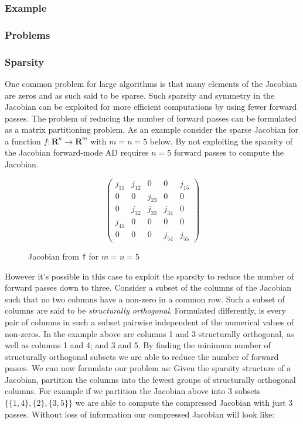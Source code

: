 \subsubsection{Example}
\subsubsection{Problems}
\subsubsection{Sparsity}
One common problem for large algorithms is that many elements of the Jacobian
are zeros and as such said to be sparse. Such sparsity and symmetry in the Jacobian can 
be exploited for more efficient computations by using fewer forward passes. The problem
of reducing the number of forward passes can be formulated as a matrix partitioning problem. 
As an example consider the sparse Jacobian for a function $f: \mathbf{R}^n \to  \mathbf{R}^m$ with $m=n=5$ below. By not exploiting the sparsity of the Jacobian forward-mode AD requires $n=5$ forward passes to compute the Jacobian.
\begin{figure}[H]
	$$ \left(\begin{matrix}
    j_{11} & j_{12} & 0 & 0 & j_{15} \\
    0 & 0 & j_{23} & 0 & 0 \\
    0 & j_{32} & j_{33} & j_{34} & 0 \\
    j_{41} & 0 & 0 & 0 & 0 \\
    0 & 0 & 0 & j_{54} & j_{55} 
	\end{matrix}\right) $$
	\caption{Jacobian from \texttt{f} for $m=n=5$}
\end{figure}
However it's possible in this case to exploit the sparsity to reduce the number of forward passes down to three. Consider a subset of the columns of the Jacobian such that no two columns have a non-zero in a common row. Such a subset of columns are said to be \emph{structurally orthogonal}. Formulated differently, is every pair of columns in such a subset pairwise independent of the numerical values of non-zeros. In the example above are columns 1 and 3 structurally orthogonal, as well as columns 1 and 4; and 3 and 5. By finding the minimum number of structurally orthogonal subsets we are able to reduce the number of forward passes. 
We can now formulate our problem as:
Given the sparsity structure of a Jacobian, partition the columns into the fewest groups of structurally orthogonal columns. For example if we partition the Jacobian above into 3 subsets $\{\{1,4\}, \{2\}, \{3,5\}\}$ we are able to compute the compressed Jacobian with just 3 passes. Without loss of information our compressed Jacobian will look like: 
